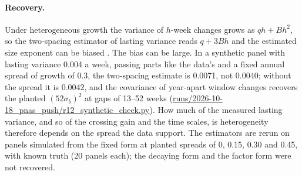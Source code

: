 \documentclass[10pt]{article}
\begin{document}
\paragraph{Recovery.} Under heterogeneous growth the variance of $h$-week changes grows as $qh + Bh^2$, so the two-spacing estimator of lasting variance reads $q + 3Bh$ and the estimated size exponent can be biased \cite{guvenen2009,hryshko2012}. The bias can be large. In a synthetic panel with lasting variance 0.004 a week, passing parts like the data's and a fixed annual spread of growth of 0.3, the two-spacing estimate is 0.0071, not 0.0040; without the spread it is 0.0042, and the covariance of year-apart window changes recovers the planted $(52\sigma_b)^2$ at gaps of 13--52 weeks (\url{runs/2026-10-18_pnas_push/r12_synthetic_check.py}). How much of the measured lasting variance, and so of the crossing gain and the time scales, is heterogeneity therefore depends on the spread the data support. The estimators are rerun on panels simulated from the fixed form at planted spreads of 0, 0.15, 0.30 and 0.45, with known truth (20 panels each); the decaying form and the factor form were not recovered.
\end{document}
